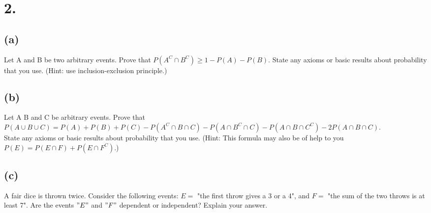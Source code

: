 \documentclass{article}
\begin{document}
\section*{2.}
{\Large

\subsection*{(a)}
Let A and B be two arbitrary events. Prove that $P(A^C \cap B^C) \geq 1 - P(A) - P(B)$. State any
axioms or basic results about probability that you use. (Hint: use inclusion-exclusion principle.)

\subsection*{(b)}
Let A B and C be arbitrary events. Prove that \\ 
$P(A \cup B \cup C) = P(A) + P(B) + P(C) - P(A^C \cap B \cap C) - P(A \cap B^C \cap C) - P(A \cap B \cap C^C) - 2P(A \cap B \cap C)$.\\ 
State any axioms or basic results about probability that you use. (Hint: This formula may also be of help
to you $P(E) = P(E \cap F) + P(E \cap F^C)$.)

\subsection*{(c)}
A fair dice is thrown twice. Consider the following events:
$ E =$ "the first throw gives a 3 or a 4", and
$ F =$ "the sum of the two throws is at least 7".
Are the events $"E"$ and $"F"$ dependent or independent? Explain your answer.

}
\end{document}
